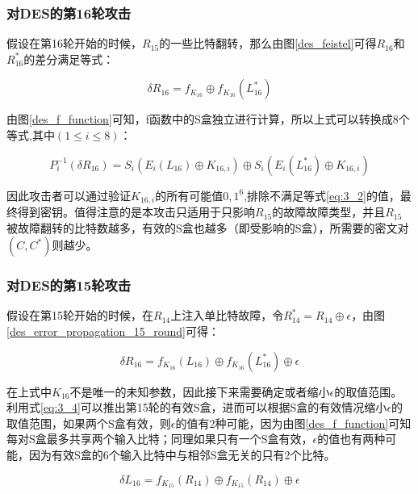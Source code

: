 \documentclass[a4paper,12pt]{article}
\begin{document}
\begin{CJK}{UTF8}{gkai}
\subsubsection{对DES的第16轮攻击}
假设在第16轮开始的时候，$R_{15}$的一些比特翻转，那么由图\ref{des_feistel}可得$R_{16}$和$R_{16}^*$的差分满足等式：

\begin{equation}
\label{eq:3_1}
\delta R_{16} = f_{K_{16}} \oplus f_{K_{16}}(L_{16}^*)
\end{equation}

由图\ref{des_f_function}可知，f函数中的S盒独立进行计算，所以上式可以转换成8个等式,其中$(1 \leq i \leq 8)$：

\begin{equation}
\label{eq:3_2}
P_i^{-1}(\delta R_{16}) = S_i(E_i(L_{16}) \oplus K_{16,i}) \oplus S_i(E_i(L_{16}^*) \oplus K_{16,i})
\end{equation}

因此攻击者可以通过验证$K_{16,i}$的所有可能值${0,1}^6$,排除不满足等式\ref{eq:3_2}的值，最终得到密钥。值得注意的是本攻击只适用于只影响$R_{15}$的故障故障类型，并且$R_{15}$被故障翻转的比特数越多，有效的S盒也越多（即受影响的S盒），所需要的密文对$(C,C^*)$则越少。

\subsubsection{对DES的第15轮攻击}
假设在第15轮开始的时候，在$R_{14}$上注入单比特故障，令$R_{14}^*=R_{14} \oplus \epsilon$，由图\ref{des_error_propagation_15_round}可得：

\begin{equation}
\label{eq:3_3}
\delta R_{16} = f_{K_{16}}(L_{16}) \oplus f_{K_{16}}(L_{16}^*) \oplus \epsilon
\end{equation}

在上式中$K_{16}$不是唯一的未知参数，因此接下来需要确定或者缩小$\epsilon$的取值范围。利用式\ref{eq:3_4}可以推出第15轮的有效S盒，进而可以根据S盒的有效情况缩小$\epsilon$的取值范围，如果两个S盒有效，则$\epsilon$的值有2种可能，因为由图\ref{des_f_function}可知每对S盒最多共享两个输入比特；同理如果只有一个S盒有效，$\epsilon$的值也有两种可能，因为有效S盒的6个输入比特中与相邻S盒无关的只有2个比特。

\begin{equation}
\label{eq:3_4}
\delta L_{16} = f_{K_{15}}(R_{14}) \oplus f_{K_{15}}(R_{14}) \oplus \epsilon
\end{equation}


\end{CJK}
\end{document}
